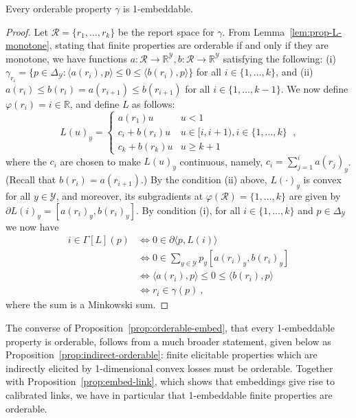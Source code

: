 \documentclass[anon,12pt]{colt2019}
\newcommand{\reals}{\mathbb{R}}
\newcommand{\prop}[1]{\Gamma[#1]}
\newcommand{\simplex}{\Delta_\Y}
\newcommand{\R}{\mathcal{R}}
\newcommand{\Y}{\mathcal{Y}}
\newcommand{\inprod}[2]{\langle #1, #2 \rangle}%
\begin{document}
\begin{proposition}\label{prop:orderable-embed}
  Every orderable property $\gamma$ is 1-embeddable.
\end{proposition}
\begin{proof}
  Let $\R = \{r_1,\ldots,r_k\}$ be the report space for $\gamma$.
  From Lemma~\ref{lem:prop-L-monotone}, stating that finite properties are orderable if and only if they are monotone, we have functions $a:\R\to\reals^\Y, b:\R\to\reals^\Y$ satisfying the following: (i) $\gamma_{r_i} = \{p\in\simplex : \inprod{a(r_i)}{p} \leq 0 \leq \inprod{b(r_i)}{p} \}$ for all $i\in\{1,\ldots,k\}$, and (ii) $a(r_i) \leq b(r_i) = a(r_{i+1}) \leq b(r_{i+1})$ for all $i \in \{1,\ldots,k-1\}$.
  We now define $\varphi(r_i) = i \in \reals$, and define $L$ as follows:
  \begin{equation*}
    L(u)_y =
    \begin{cases}
      a(r_1) u & u < 1 \\
      c_i + b(r_i) u & u \in [i,i+1), i\in\{1,\ldots,k\} \\
      c_k + b(r_k) u & u \geq k+1
    \end{cases}~,
  \end{equation*}
  where the $c_i$ are chosen to make $L(u)_y$ continuous, namely, $c_i = \sum_{j=1}^{i} a(r_j)_y$.
  (Recall that $b(r_i) = a(r_{i+1})$.)
  By the condition (ii) above, $L(\cdot)_y$ is convex for all $y\in\Y$, and moreover, its subgradients at $\varphi(\R) = \{1,\ldots,k\}$ are given by
  $\partial L(i)_y = [a(r_i)_y,b(r_i)_y]$.
  By condition (i), for all $i\in\{1,\ldots,k\}$ and $p\in\simplex$ we now have
  \begin{align*}
    i \in \prop{L}(p)
    &\iff 0 \in \partial \inprod{p}{L(i)} \\
    &\iff 0 \in \sum_{y\in\Y} p_y [a(r_i)_y,b(r_i)_y] \\
    &\iff \inprod{a(r_i)}{p} \leq 0 \leq \inprod{b(r_i)}{p} \\
    &\iff r_i \in \gamma(p)~,
  \end{align*}
  where the sum is a Minkowski sum.
\end{proof}

The converse of Proposition~\ref{prop:orderable-embed}, that every 1-embeddable property is orderable, follows from a much broader statement, given below as Proposition~\ref{prop:indirect-orderable}: finite elicitable properties which are indirectly elicited by 1-dimensional convex losses must be orderable.
Together with Proposition~\ref{prop:embed-link}, which shows that embeddings give rise to calibrated links, we have in particular that 1-embeddable finite properties are orderable.
\end{document}
